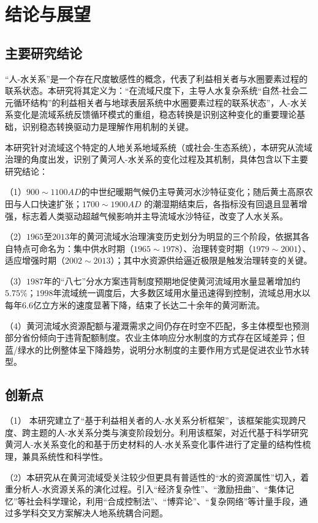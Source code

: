 \chapter{结论与展望}

\section{主要研究结论}

“人-水关系”是一个存在尺度敏感性的概念，代表了利益相关者与水圈要素过程的联系状态。本研究将其定义为：“在流域尺度下，主导人水复杂系统“自然-社会二元循环结构”的利益相关者与地球表层系统中水圈要素过程的联系状态”，人-水关系变化是流域系统反馈循环模式的重组，稳态转换是识别这种变化的重要理论基础，识别稳态转换驱动力是理解作用机制的关键。

本研究针对流域这个特定的人地关系地域系统（或社会-生态系统），本研究从流域治理的角度出发，识别了黄河人-水关系的变化过程及其机制，具体包含以下主要研究结论：

（1）$900 \sim 1100AD$的中世纪暖期气候仍主导黄河水沙特征变化；随后黄土高原农田与人口快速扩张；$1700 \sim 1900AD$ 的潮湿期结束后，各指标没有回退且显著增强，标志着人类驱动超越气候影响并主导流域水沙特征，改变了人水关系。

（2）$1965$至$2013$年的黄河流域水治理演变历史划分为明显的三个阶段，依据其各自特点可命名为：集中供水时期（$1965 \sim 1978$）、治理转变时期（$1979 \sim 2001$）、适应增强时期（$2002 \sim 2013$）；其中水资源供给逼近极限是触发治理转变的关键。

（3）$1987$年的“八七”分水方案违背制度预期地促使黄河流域用水量显著增加约$5.75\%$；$1998$年流域统一调度后，大多数区域用水量迅速得到控制，流域总用水以每年$6.6$亿立方米的速度显著下降，结束了长达二十余年的黄河断流。

（4）黄河流域水资源配额与灌溉需求之间仍存在时空不匹配，多主体模型也预测部分省份倾向于违背配额制度。农业主体响应分水制度的方式存在区域差异；但蓝/绿水的比例整体呈下降趋势，说明分水制度的主要作用方式是促进农业节水转型。


\section{创新点}

（1） 本研究建立了“基于利益相关者的人-水关系分析框架”，该框架能实现跨尺度、跨主题的人-水关系分类与演变阶段划分。利用该框架，对近代基于科学研究黄河人-水关系变化的和基于历史材料的人-水关系变化事件进行了定量的结构性梳理，兼具系统性和科学性。

（2）本研究从在黄河流域受关注较少但更具有普适性的“水的资源属性”切入，着重分析人-水资源关系的演化过程。引入“经济复杂性”、“激励扭曲”、“集体记忆”等社会科学理论，利用“合成控制法”、“博弈论”、“复杂网络”等计量手段，通过多学科交叉方案解决人地系统耦合问题。


